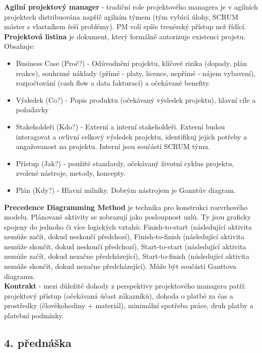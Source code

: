 \documentclass[11pt,a4paper]{article}
\begin{document}
        \textbf{Agilní projektový manager} - tradiční role projektového managera je v agilních projektech distribuována napříč agilním týmem (tým vybírá úlohy, SCRUM máster s vlastníkem řeší problémy). PM volí spíše trenérský přístup než řídící.\\
        \textbf{Projektová listina} je dokument, který formálně autorizuje existenci projetu. Obsahuje:
        \begin{itemize}
            \item Business Case (Proč?) -  Odůvodnění projektu, klíčové rizika (dopady, plán reakce), souhrnné náklady (přímé - platy, licence, nepřímé - nájem vybavení), rozpočtování (cash flow a data fakturací) a očekávané benefity.
            \item Výsledek (Co?) - Popis produktu (očekávaný výsledek projektu), hlavní cíle a požadavky
            \item Stakeholdeři (Kdo?) - Externí a interní stakeholdeři. Externí budou interagovat a ovlivní celkový výsledek projektu, identifikuj jejich potřeby a angažovanost na projektu. Interní jsou součástí SCRUM týmu.
            \item Přístup (Jak?) -  použité standardy, očekávaný životní cyklus projektu, zvolené nástroje, metody, koncepty.
            \item Plán (Kdy?) - Hlavní milníky. Dobrým nástrojem je Ganntův diagram.
        \end{itemize}
        \textbf{Precedence Diagramming Method} je technika pro konstrukci rozvrhového modelu. Plánované aktivity se zobrazují jako posloupnost uzlů. Ty jsou graficky spojeny do jednoho či více logických vztahů: Finish-to-start (následující aktivita nemůže začít, dokud neskončí předchozí), Finish-to-finish (následující aktivita nemůže skončit, dokud neskončí předchozí), Start-to-start (následující aktivita nemůže začít, dokud nezačne předcházející), Start-to-finish (následující aktivita nemůže skončit, dokud nezačne předcházející). Může být součástí Ganttova diagramu.\\
        \textbf{Kontrakt} - mezi důležité dohody z perspektivy projektového managera patří: projektový přístup (očekávaná účast zákazníků), dohoda o platbě za čas a prostředky (člověkohodiny + materiál), minimální spotřeba práce, druh platby a platební podmínky.
    \subsection{4. přednáška}
\end{document}
